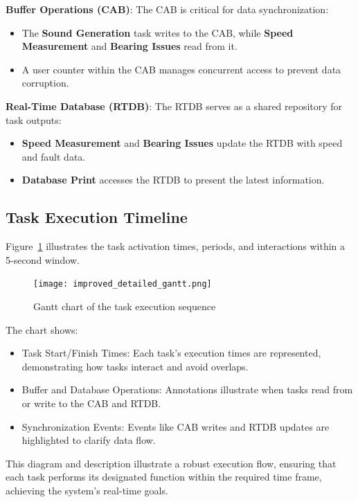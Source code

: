 \documentclass[a4paper,12pt]{article}
\begin{document}
\textbf{Buffer Operations (CAB)}: The CAB is critical for data synchronization:
\begin{itemize}
    \item The \textbf{Sound Generation} task writes to the CAB, while \textbf{Speed Measurement} and \textbf{Bearing Issues} read from it.
    \item A user counter within the CAB manages concurrent access to prevent data corruption.
\end{itemize}

\textbf{Real-Time Database (RTDB)}: The RTDB serves as a shared repository for task outputs:
\begin{itemize}
    \item \textbf{Speed Measurement} and \textbf{Bearing Issues} update the RTDB with speed and fault data.
    \item \textbf{Database Print} accesses the RTDB to present the latest information.
\end{itemize}

\subsection{Task Execution Timeline}

Figure~\ref{fig:gantt} illustrates the task activation times, periods, and interactions within a 5-second window.

\begin{figure}[H]
    \centering
    \texttt{[image: improved\_detailed\_gantt.png]}
    \caption{Gantt chart of the task execution sequence}
    \label{fig:gantt}
\end{figure}

The chart shows:
\begin{itemize}
    \item Task Start/Finish Times: Each task's execution times are represented, demonstrating how tasks interact and avoid overlaps.
    \item Buffer and Database Operations: Annotations illustrate when tasks read from or write to the CAB and RTDB.
    \item Synchronization Events: Events like CAB writes and RTDB updates are highlighted to clarify data flow.
\end{itemize}

This diagram and description illustrate a robust execution flow, ensuring that each task performs its designated function within the required time frame, achieving the system’s real-time goals.
\end{document}
